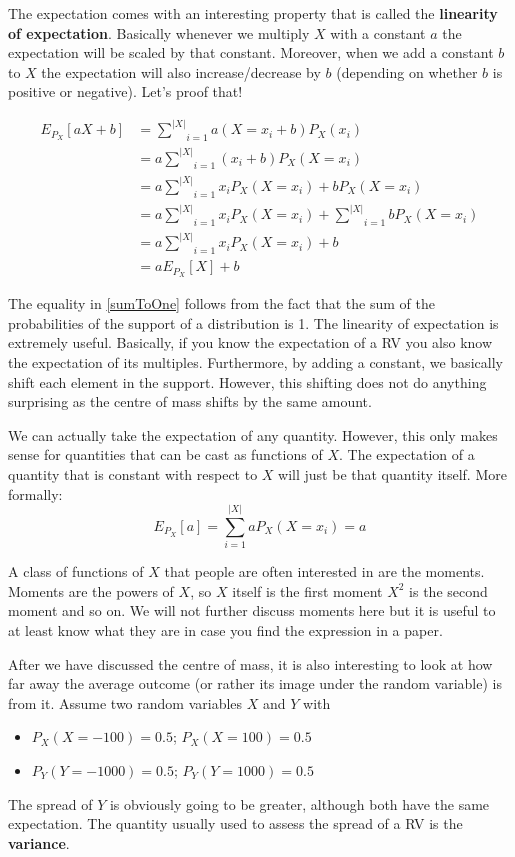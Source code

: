 \documentclass[a4paper,11pt,leqno]{report}
\begin{document}
The expectation comes with an interesting property that is called the \textbf{linearity of expectation}. Basically whenever
we multiply $ X $ with a constant $ a $ the expectation will be scaled by that constant. Moreover, when we add a constant $ b $
to $ X $ the expectation will also increase/decrease by $ b $ (depending on whether $ b $ is positive or negative). Let's
proof that!

\begin{align}
E_{P_{X}}[aX+b] &= \underset{i = 1}{\overset{|X|}{\sum}} a(X=x_{i}+b) P_{X}(x_{i}) \\
&= a \underset{i = 1}{\overset{|X|}{\sum}} (x_{i}+b) P_{X}(X= x_{i}) \\
&= a \underset{i = 1}{\overset{|X|}{\sum}} x_{i}P_{X}(X=x_{i})+bP_{X}(X=x_{i}) \\
&= a \underset{i = 1}{\overset{|X|}{\sum}} x_{i}P_{X}(X=x_{i}) + \underset{i = 1}{\overset{|X|}{\sum}}bP_{X}(X=x_{i}) \\
&= a \underset{i = 1}{\overset{|X|}{\sum}} x_{i}P_{X}(X=x_{i}) + b \label{sumToOne} \\
&= a E_{P_{X}}[X]+b 
\end{align}

The equality in \ref{sumToOne} follows from the fact that the sum of the probabilities of the support of a distribution is 1.
The linearity of expectation is extremely useful. Basically, if you know the expectation of a RV you also know the 
expectation of its multiples. Furthermore, by adding a constant, we basically shift each element in the support. However, this shifting
does not do anything surprising as the centre of mass shifts by the same amount.

We can actually take the expectation of any quantity. However, this only makes sense for quantities that
can be cast as functions of $ X $. The expectation of a quantity that is constant with respect to $ X $ will just be that
quantity itself. More formally:
\begin{equation}
E_{P_{X}}[a] = \underset{i = 1}{\overset{|X|}{\sum}} aP_{X}(X=x_{i}) = a
\end{equation}

A class of functions of $ X $ that people are often interested in are the moments. Moments are the powers of $ X $, so $ X $ itself
is the first moment $ X^{2} $ is the second moment and so on. We will not further discuss moments here but it is useful to at
least know what they are in case you find the expression in a paper.

After we have discussed the centre of mass, it is also interesting to look at how far away the average outcome (or rather its image
under the random variable) is from it. Assume two random variables $ X $ and $ Y $ with
\begin{itemize}
\item $ P_{X}(X=-100) = 0.5 $; $ P_{X}(X=100) = 0.5 $
\item $ P_{Y}(Y=-1000) = 0.5 $; $ P_{Y}(Y=1000) = 0.5 $
\end{itemize}
The spread of $ Y $ is obviously going to be greater, although both have the same expectation. The quantity usually used to assess
the spread of a RV is the \textbf{variance}.
\end{document}
